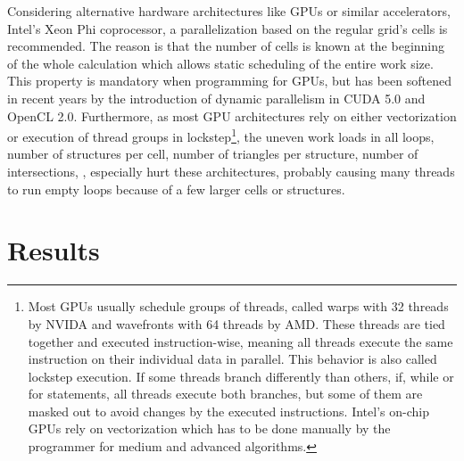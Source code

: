 Considering alternative hardware architectures like GPUs or similar accelerators, \eg Intel's Xeon Phi coprocessor, a parallelization based on the regular grid's cells is recommended.
The reason is that the number of cells is known at the beginning of the whole calculation which allows static scheduling of the entire work size.
This property is mandatory when programming for GPUs, but has been softened in recent years by the introduction of dynamic parallelism in CUDA 5.0 and OpenCL 2.0.
Furthermore, as most GPU architectures rely on either vectorization or execution of thread groups in lockstep\footnote{
	Most GPUs usually schedule groups of threads, called warps with 32 threads by NVIDA and wavefronts with 64 threads by AMD.
	These threads are tied together and executed instruction-wise, meaning all threads execute the same instruction on their individual data in parallel.
	This behavior is also called lockstep execution.
	If some threads branch differently than others, \eg if, while or for statements, all threads execute both branches, but some of them are masked out to avoid changes by the executed instructions.
	Intel's on-chip GPUs rely on vectorization which has to be done manually by the programmer for medium and advanced algorithms.},
the uneven work loads in all loops, \eg number of structures per cell, number of triangles per structure, number of intersections, \etc, especially hurt these architectures, probably causing many threads to run empty loops because of a few larger cells or structures.


\section{Results}
\label{sec:direct_intersection_results}

